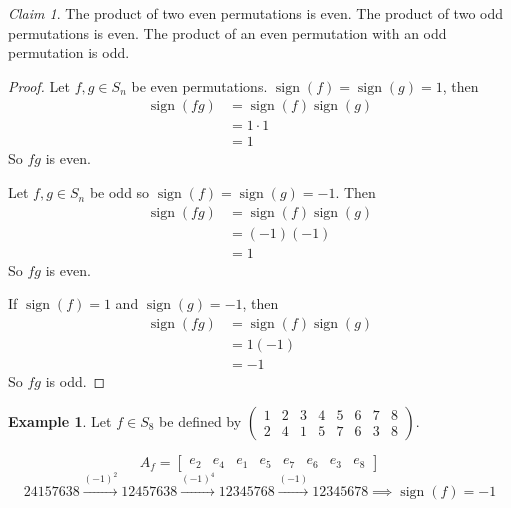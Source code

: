 \documentclass[12pt,letterpaper,DIV=11,final]{scrartcl}
\theoremstyle{plain}
\theoremstyle{definition}
\newtheorem{example}{Example}[section]
\theoremstyle{remark}
\newtheorem{claim}{Claim}
\DeclareMathOperator{\sign}{sign}
\begin{document}
\begin{claim}
  The product of two even permutations is even.
  The product of two odd permutations is even.
  The product of an even permutation with an odd permutation is odd.

  \begin{proof}
    Let $f, g \in S_n$ be even permutations.
    $\sign(f) = \sign(g) = 1$, then
    \begin{align*}
      \sign(fg) &= \sign(f) \sign(g) \\
                &= 1 \cdot 1 \\
                &= 1
    \end{align*}
    So $fg$ is even.

    Let $f, g \in S_n$ be odd so $\sign(f) = \sign(g) = -1$.
    Then
    \begin{align*}
      \sign(fg) &= \sign(f) \sign(g) \\
                &= (-1)(-1) \\
                &= 1
    \end{align*}
    So $fg$ is even.

    If $\sign(f) = 1$ and $\sign(g) = -1$, then
    \begin{align*}
      \sign(fg) &= \sign(f) \sign(g) \\
                &= 1 (-1) \\
                &= -1
    \end{align*}
    So $fg$ is odd.
  \end{proof}
\end{claim}

\begin{example}
  Let $f \in S_8$ be defined by $\begin{pmatrix}
    1 & 2 & 3 & 4 & 5 & 6 & 7 & 8 \\
    2 & 4 & 1 & 5 & 7 & 6 & 3 & 8
  \end{pmatrix}$.

  \begin{displaymath}
    A_f = \begin{bmatrix}
      e_2 & e_4 & e_1 & e_5 & e_7 & e_6 & e_3 & e_8
    \end{bmatrix}
  \end{displaymath}
  \begin{displaymath}
    2 4 1 5 7 6 3 8 \xrightarrow{{(-1)}^2} 1 2 4 5 7 6 3 8 \xrightarrow{{(-1)}^4} 1 2 3 4 5 7 6 8 \xrightarrow{(-1)} 1 2 3 4 5 6 7 8 \implies \sign(f) = -1
  \end{displaymath}
\end{example}
\end{document}
